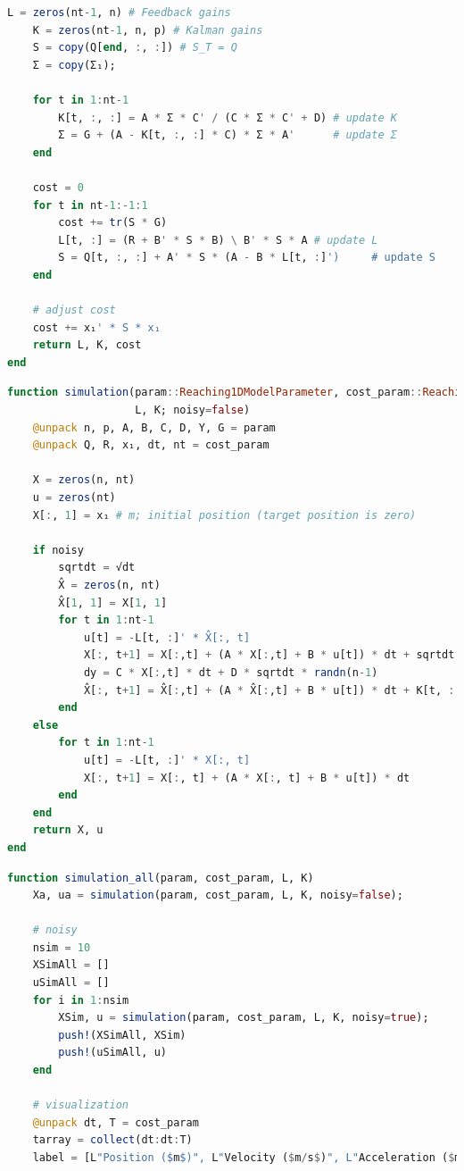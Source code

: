 \begin{itemize}
\begin{lstlisting}[language=julia]
    L = zeros(nt-1, n) # Feedback gains
    K = zeros(nt-1, n, p) # Kalman gains
    S = copy(Q[end, :, :]) # S_T = Q
    Σ = copy(Σ₁);

    for t in 1:nt-1
        K[t, :, :] = A * Σ * C' / (C * Σ * C' + D) # update K
        Σ = G + (A - K[t, :, :] * C) * Σ * A'      # update Σ
    end　

    cost = 0
    for t in nt-1:-1:1
        cost += tr(S * G)
        L[t, :] = (R + B' * S * B) \ B' * S * A # update L
        S = Q[t, :, :] + A' * S * (A - B * L[t, :]')     # update S
    end
    
    # adjust cost
    cost += x₁' * S * x₁
    return L, K, cost
end
\end{lstlisting}
\begin{lstlisting}[language=julia]
function simulation(param::Reaching1DModelParameter, cost_param::Reaching1DModelCostParameter, 
                    L, K; noisy=false)
    @unpack n, p, A, B, C, D, Y, G = param
    @unpack Q, R, x₁, dt, nt = cost_param
    
    X = zeros(n, nt)
    u = zeros(nt)
    X[:, 1] = x₁ # m; initial position (target position is zero)

    if noisy
        sqrtdt = √dt
        X̂ = zeros(n, nt)
        X̂[1, 1] = X[1, 1]
        for t in 1:nt-1
            u[t] = -L[t, :]' * X̂[:, t]
            X[:, t+1] = X[:,t] + (A * X[:,t] + B * u[t]) * dt + sqrtdt * (Y * u[t] * randn() + G * randn(n))
            dy = C * X[:,t] * dt + D * sqrtdt * randn(n-1)
            X̂[:, t+1] = X̂[:,t] + (A * X̂[:,t] + B * u[t]) * dt + K[t, :, :] * (dy - C * X̂[:,t] * dt)
        end
    else
        for t in 1:nt-1
            u[t] = -L[t, :]' * X[:, t]
            X[:, t+1] = X[:, t] + (A * X[:, t] + B * u[t]) * dt
        end
    end
    return X, u
end
\end{lstlisting}
\begin{lstlisting}[language=julia]
function simulation_all(param, cost_param, L, K)
    Xa, ua = simulation(param, cost_param, L, K, noisy=false);
    
    # noisy
    nsim = 10
    XSimAll = []
    uSimAll = []
    for i in 1:nsim
        XSim, u = simulation(param, cost_param, L, K, noisy=true);
        push!(XSimAll, XSim)
        push!(uSimAll, u)
    end
    
    # visualization
    @unpack dt, T = cost_param
    tarray = collect(dt:dt:T)
    label = [L"Position ($m$)", L"Velocity ($m/s$)", L"Acceleration ($m/s^2$)", L"Jerk ($m/s^3$)"]


\end{lstlisting}
\end{itemize}
